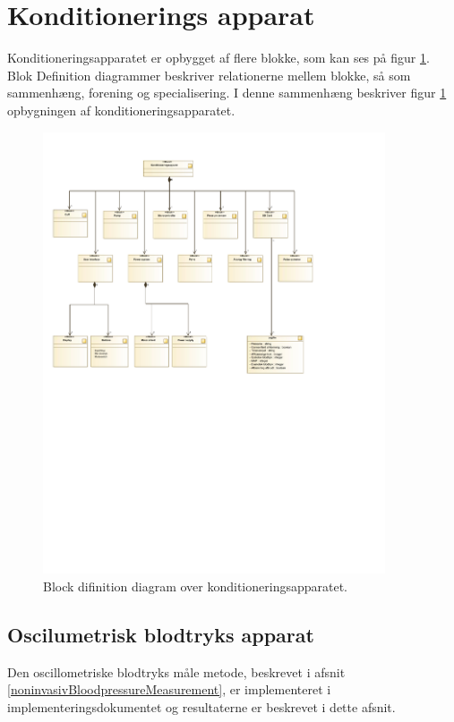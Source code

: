 \section{Konditionerings apparat}
Konditioneringsapparatet er opbygget af flere blokke, som kan ses på figur \ref{fig:BDD(SystemOverview)}. Blok Definition diagrammer beskriver relationerne mellem blokke, så som sammenhæng, forening og specialisering. I denne sammenhæng beskriver figur \ref{fig:BDD(SystemOverview)} opbygningen af konditioneringsapparatet. 
\begin{figure}[H]
	\centering
	\includegraphics[width=0.9\textwidth]{billeder/BDD(SystemOverview).pdf}
	\caption{Block difinition diagram over konditioneringsapparatet.}\label{fig:BDD(SystemOverview)}
\end{figure}

\subsection{Oscilumetrisk blodtryks apparat}
Den oscillometriske blodtryks måle metode, beskrevet i afsnit \ref{noninvasivBloodpressureMeasurement}, er implementeret i implementeringsdokumentet og resultaterne er beskrevet i dette afsnit.

